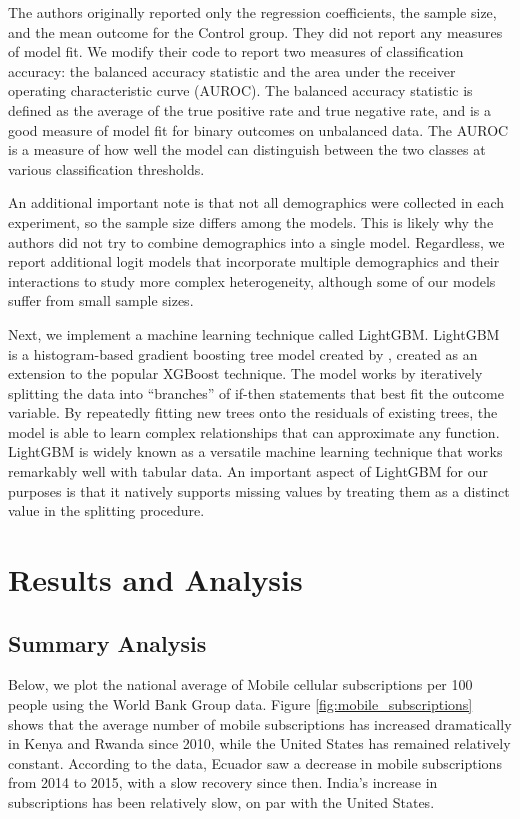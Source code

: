 \documentclass[12pt]{article}
\begin{document}
The authors originally reported only the regression coefficients, the sample size, and the mean outcome for the Control group. They did not report any measures of model fit. We modify their code to report two measures of classification accuracy: the balanced accuracy statistic and the area under the receiver operating characteristic curve (AUROC). The balanced accuracy statistic is defined as the average of the true positive rate and true negative rate, and is a good measure of model fit for binary outcomes on unbalanced data. The AUROC is a measure of how well the model can distinguish between the two classes at various classification thresholds.

An additional important note is that not all demographics were collected in each experiment, so the sample size differs among the models. This is likely why the authors did not try to combine demographics into a single model. Regardless, we report additional logit models that incorporate multiple demographics and their interactions to study more complex heterogeneity, although some of our models suffer from small sample sizes.

Next, we implement a machine learning technique called LightGBM. LightGBM is a histogram-based gradient boosting tree model created by \textcite{ke_lightgbm_2017}, created as an extension to the popular XGBoost technique. The model works by iteratively splitting the data into ``branches'' of if-then statements that best fit the outcome variable. By repeatedly fitting new trees onto the residuals of existing trees, the model is able to learn complex relationships that can approximate any function. LightGBM is widely known as a versatile machine learning technique that works remarkably well with tabular data. An important aspect of LightGBM for our purposes is that it natively supports missing values by treating them as a distinct value in the splitting procedure. 

\section{Results and Analysis}
\label{section:results}
\subsection{Summary Analysis}
Below, we plot the national average of Mobile cellular subscriptions per 100 people using the World Bank Group data. Figure \ref{fig:mobile_subscriptions} shows that the average number of mobile subscriptions has increased dramatically in Kenya and Rwanda since 2010, while the United States has remained relatively constant. According to the data, Ecuador saw a decrease in mobile subscriptions from 2014 to 2015, with a slow recovery since then. India's increase in subscriptions has been relatively slow, on par with the United States. 
\end{document}
